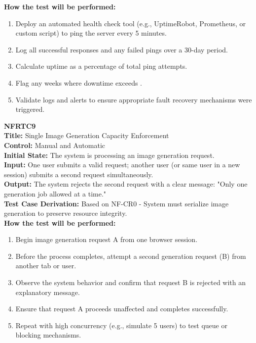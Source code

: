 \documentclass[12pt, titlepage]{article}
\begin{document}
\textbf{How the test will be performed:}
\begin{enumerate}
  \item Deploy an automated health check tool (e.g., UptimeRobot, Prometheus, or custom script) to ping the server every 5 minutes.
  \item Log all successful responses and any failed pings over a 30-day period.
  \item Calculate uptime as a percentage of total ping attempts.
  \item Flag any weeks where downtime exceeds \MAXDOWNTIME{}.
  \item Validate logs and alerts to ensure appropriate fault recovery mechanisms were triggered.
\end{enumerate}

\vspace{1em}

\textbf{NFRTC9}\\
\textbf{Title:} Single Image Generation Capacity Enforcement\\
\textbf{Control:} Manual and Automatic\\
\textbf{Initial State:} The system is processing an image generation request.\\
\textbf{Input:} One user submits a valid request; another user (or same user in a new session) submits a second request simultaneously.\\
\textbf{Output:} The system rejects the second request with a clear message: "Only one generation job allowed at a time."\\
\textbf{Test Case Derivation:} Based on NF-CR0 - System must serialize image generation to preserve resource integrity.\\
\textbf{How the test will be performed:}
\begin{enumerate}
  \item Begin image generation request A from one browser session.
  \item Before the process completes, attempt a second generation request (B) from another tab or user.
  \item Observe the system behavior and confirm that request B is rejected with an explanatory message.
  \item Ensure that request A proceeds unaffected and completes successfully.
  \item Repeat with high concurrency (e.g., simulate 5 users) to test queue or blocking mechanisms.
\end{enumerate}
\end{document}
